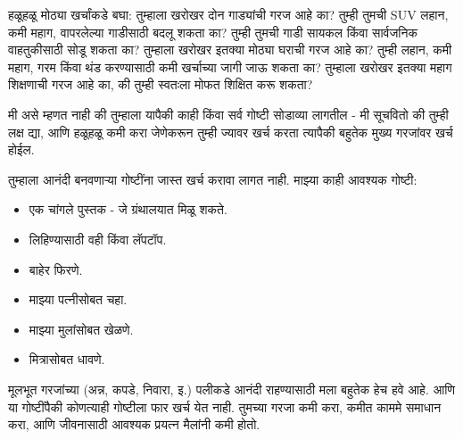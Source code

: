हळूहळू मोठ्या खर्चांकडे बघा: तुम्हाला खरोखर दोन गाड्यांची गरज आहे का? तुम्ही तुमची SUV लहान, कमी महाग, वापरलेल्या गाडीसाठी बदलू शकता का? तुम्ही तुमची गाडी सायकल किंवा सार्वजनिक वाहतुकीसाठी सोडू शकता का? तुम्हाला खरोखर इतक्या मोठ्या घराची गरज आहे का? तुम्ही लहान, कमी महाग, गरम किंवा थंड करण्यासाठी कमी खर्चाच्या जागी जाऊ शकता का? तुम्हाला खरोखर इतक्या महाग शिक्षणाची गरज आहे का, की तुम्ही स्वतःला मोफत शिक्षित करू शकता?

मी असे म्हणत नाही की तुम्हाला यापैकी काही किंवा सर्व गोष्टी सोडाव्या लागतील - मी सूचवितो की तुम्ही लक्ष द्या, आणि हळूहळू कमी करा जेणेकरून तुम्ही ज्यावर खर्च करता त्यापैकी बहुतेक मुख्य गरजांवर खर्च होईल.

तुम्हाला आनंदी बनवणाऱ्या गोष्टींना जास्त खर्च करावा लागत नाही. माझ्या काही आवश्यक गोष्टी:

\begin{itemize}
\item एक चांगले पुस्तक - जे ग्रंथालयात मिळू शकते.
\item लिहिण्यासाठी वही किंवा लॅपटॉप.
\item बाहेर फिरणे.
\item माझ्या पत्नीसोबत चहा.
\item माझ्या मुलांसोबत खेळणे.
\item मित्रासोबत धावणे.
\end{itemize}
मूलभूत गरजांच्या (अन्न, कपडे, निवारा, इ.) पलीकडे आनंदी राहण्यासाठी मला बहुतेक हेच हवे आहे. आणि या गोष्टींपैकी कोणत्याही गोष्टीला फार खर्च येत नाही.
तुमच्या गरजा कमी करा, कमीत काममे समाधान करा, आणि जीवनासाठी आवश्यक प्रयत्न मैलांनी कमी होतो.


